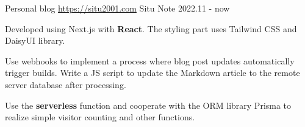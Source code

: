 
\begin{cventries}



\cventry
     {Personal blog \href{https://situ2001.com}{https://situ2001.com}} %
     {Situ Note} %
     {} %
     {2022.11 - now} %
     {
     \begin{cvitems} %
         \item {Developed using Next.js with \textbf{React}. The styling part uses Tailwind CSS and DaisyUI library. }
         \item {Use webhooks to implement a process where blog post updates automatically trigger builds. Write a JS script to update the Markdown article to the remote server database after processing. }
         \item {Use the \textbf{serverless} function and cooperate with the ORM library Prisma to realize simple visitor counting and other functions. }
     \end{cvitems}
     }

\end{cventries}
